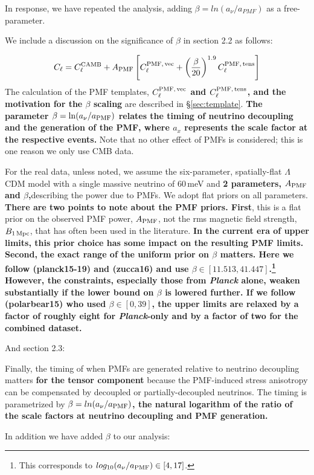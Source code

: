 \documentclass{article}
\newcommand{\cpmftens}{\ensuremath{C_{\ell}^{\rm PMF,\,tens}}}
\newcommand{\cpmfvec}{\ensuremath{C_{\ell}^{\rm PMF,\,vec}}}
\newcommand{\apmf}{\ensuremath{A_{\rm PMF}}}
\newcommand{\bpmf}{\ensuremath{B_{\rm 1\,Mpc}}}
\newcommand{\lcdm}{\ensuremath{\Lambda}CDM}
\newcommand{\be}{\begin{equation}}
\newcommand{\ee}{\end{equation}}
\newcommand{\planck}{{\sl Planck}}
\newcommand{\added}[1]{\textbf{#1}}
\newcommand{\diff}[1]{\textcolor{PineGreen}{#1}}
\begin{document}
In response, we have repeated the analysis, adding $\beta = ln(a_{\nu}/a_{PMF})$ as a free-parameter.

We include a discussion on the significance of $\beta$ in section 2.2 as follows:

\diff{
\be
C_\ell = C_\ell^{\rm{CAMB}} + \apmf \left[\cpmfvec + \left(\frac{\beta}{20}\right)^{1.9}  \cpmftens \right]
\ee
The calculation of the PMF templates,\added{ \cpmfvec{} and \cpmftens{}, and the motivation for the $\beta$ scaling} are described in \S\ref{sec:template}. 
\added{The parameter $\beta = {\rm ln}(a_{\nu}/a_{\rm{PMF}})$ relates the timing of neutrino decoupling and the generation of the PMF, where $a_x$ represents the scale factor at the respective events.} Note that no other effect of  PMFs is considered; this is one reason we only use CMB data.}

\diff{For the real data, unless noted, we assume the six-parameter, spatially-flat \lcdm{} model with a single massive neutrino of 60\,meV and \added{2 parameters, \apmf{} and $\beta$,}describing the power due to PMFs.
We adopt flat priors on all parameters. 
\added{There are two points to note about the PMF priors. 
First}, this is a flat prior on the observed PMF power, $\apmf$, not the rms magnetic field strength, \bpmf, that has often been used in the literature. 
\added{In the current era of upper limits, this prior choice has some impact on the resulting PMF limits. 
Second, the exact range of the uniform prior on $\beta$ matters. 
Here we follow (planck15-19) and  (zucca16) and use $\beta \in [11.513, 41.447]$.\footnote{This corresponds to $log_{10} (a_{\nu}/a_{\rm{PMF}}) \in[4,17]$.}
However, the constraints, especially those from \planck{} alone, weaken substantially if the lower bound on $\beta$ is lowered further. 
If we follow (polarbear15) who used $\beta \in [0,39]$, the upper limits are relaxed by a factor of roughly eight for \planck-only and by a factor of two for the combined dataset.}}

And section 2.3:

\diff{Finally, the timing of when PMFs are generated relative to neutrino decoupling matters \added{for the tensor component} because the PMF-induced stress anisotropy can be compensated by decoupled or partially-decoupled neutrinos. 
The timing is parametrized by \added{$\beta = ln(a_{\nu}/a_{\rm{PMF}})$, the natural logarithm of the ratio of the scale factors at neutrino decoupling and PMF generation.}}

In addition we have added $\beta$ to our analysis:
\end{document}
